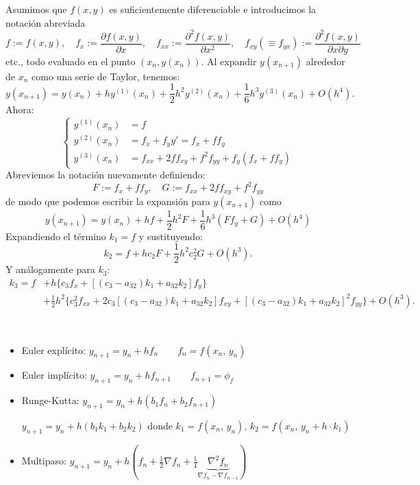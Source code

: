 Asumimos que $f(x, y)$ es suficientemente diferenciable e introducimos la notación abreviada   
$$f := f(x, y), \quad f_x := \frac{\partial f(x,y)}{\partial x}, \quad f_{xx} := \frac{\partial^2 f(x,y)}{\partial x^2}, \quad f_{xy} (\equiv f_{yx}) := \frac{\partial^2 f(x,y)}{\partial x \partial y}$$ 
etc., todo evaluado en el punto $(x_n, y(x_n))$. Al expandir $y(x_{n+1})$ alrededor de $x_n$ como una serie de Taylor, tenemos:
$$y(x_{n+1}) = y(x_n) + h y^{(1)}(x_n) + \frac{1}{2}h^2 y^{(2)}(x_n) + \frac{1}{6}h^3 y^{(3)}(x_n) + O(h^4).$$
Ahora:
$$\left\{ \begin{aligned}     y^{(1)}(x_n) &= f \\     y^{(2)}(x_n) &= f_x + f_y y' = f_x + f f_y \\     y^{(3)}(x_n) &= f_{xx} + 2f f_{xy} + f^2 f_{yy} + f_y(f_x + f f_y) \end{aligned} \right.$$
Abreviemos la notación nuevamente definiendo:
$$F := f_x + f f_y, \quad G := f_{xx} + 2f f_{xy} + f^2 f_{yy}$$
de modo que podemos escribir la expansión para $y(x_{n+1})$ como   
$$y(x_{n+1}) = y(x_n) + hf + \frac{1}{2}h^2 F + \frac{1}{6}h^3 (F f_y + G) + O(h^4)$$
Expandiendo el término $k_1 = f$ y sustituyendo:
$$k_2 = f + h c_2 F + \frac{1}{2}h^2 c_2^2 G + O(h^3).$$
Y análogamente para $k_3$:
$$\begin{aligned} k_3 = f &+ h \{c_3 f_x + [(c_3 - a_{32})k_1 + a_{32}k_2]f_y\} \\ &+ \frac{1}{2}h^2 \{c_3^2 f_{xx} + 2c_3 [(c_3 - a_{32})k_1 + a_{32}k_2] f_{xy} + [(c_3 - a_{32})k_1 + a_{32}k_2]^2 f_{yy}\} + O(h^3). \end{aligned}$$

\begin{ejems} \, 
    \begin{itemize}
        \item Euler expl\'icito: $y_{n+1} = y_n + h f_n \qquad f_n = f(x_n,\, y_n)$
        \item Euler impl\'icito: $y_{n+1} = y_n + h f_{n+1} \qquad f_{n+1} = \phi_f $
        \item Runge-Kutta: $y_{n+1} = y_n + h(b_1 f_n + b_2 f_{n+1}) $
        
        \hspace{1.5cm} $y_{n+1} = y_n + h(b_1 k_1 + b_2 k_2) $ donde $k_1 = f(x_n,\, y_n), \, k_2 = f(x_n,\, y_n+h \cdot k_1)$
        \item Multipaso: $y_{n+1} = y_n + h \left( f_n + \frac{1}{2} \nabla f_n  + \frac{1}{4} \underbrace{\nabla^2 f_n}_{\nabla f_n-\nabla f_{n-1}} \right)$
    \end{itemize}
\end{ejems}

